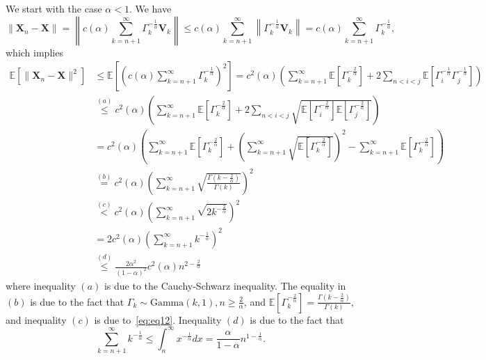 We start with the case $\alpha<1$. We have
\[
    \|\mathbf{X}_n-\mathbf{X}\|=\left\|c(\alpha) \sum_{k=n+1}^{\infty}\Gamma_{k}^{-\frac{1}{\alpha}}\mathbf{V}_k\right\|\leq c(\alpha) \sum_{k=n+1}^{\infty}\left\|\Gamma_{k}^{-\frac{1}{\alpha}}\mathbf{V}_k\right\| = c(\alpha)\sum_{k=n+1}^{\infty}\Gamma_k^{-\frac{1}{\alpha}},
\]
which implies
\begin{align}
\mathbb{E} \left[ \|\mathbf{X}_n-\mathbf{X}\|^2 \right] & \leq \mathbb{E} \left[ \left(c(\alpha)\sum_{k=n+1}^{\infty}\Gamma_k^{-\frac{1}{\alpha}}\right)^2 \right]
= c^{2}(\alpha)\left(\sum_{k=n+1}^{\infty} \mathbb{E}\left[\Gamma_k^{-\frac{2}{\alpha}}\right]+2\sum_{n<i<j}\mathbb{E}\left[\Gamma_{i}^{-\frac{1}{\alpha}}\Gamma_{j}^{-\frac{1}{\alpha}}\right]\right)\nonumber\\
&\overset{(a)}{\leq} c^{2}(\alpha)\left( \sum_{k=n+1}^{\infty} \mathbb{E}\left[ \Gamma_k^{-\frac{2}{\alpha}}\right]+2\sum_{n<i<j}\sqrt{\mathbb{E}\left[\Gamma_{i}^{-\frac{2}{\alpha}}\right]\mathbb{E}\left[\Gamma_{j}^{-\frac{2}{\alpha}}\right]}\right) \\
&=c^{2}(\alpha)\left(\sum_{k=n+1}^{\infty} \mathbb{E}\left[ \Gamma_k^{-\frac{2}{\alpha}}\right]+\left(\sum_{k=n+1}^{\infty}\sqrt{\mathbb{E}\left[\Gamma_k^{-\frac{2}{\alpha}}\right]}\right)^2-\sum_{k=n+1}^{\infty}\mathbb{E}\left[\Gamma_k^{-\frac{2}{\alpha}}\right]\right)\\
&\overset{(b)}{=}c^{2}(\alpha)\left(\sum_{k=n+1}^{\infty}\sqrt{\frac{\Gamma(k-\frac{2}{\alpha})}{\Gamma(k)}}\right)^2 \\
&\overset{(c)}{<}c^{2}(\alpha) \left(\sum_{k=n+1}^{\infty}\sqrt{2k^{-\frac{2}{\alpha}}}\right)^2 \\
&=2c^{2}(\alpha)\left(\sum_{k=n+1}^{\infty}k^{-\frac{1}{\alpha}}\right)^2\nonumber\\
&\overset{(d)}{\leq} \frac{2\alpha^2}{(1-\alpha)^2}c^{2}(\alpha)n^{2-\frac{2}{\alpha}}
\end{align}
where inequality $(a)$ is due to the Cauchy-Schwarz inequality. The equality in $(b)$ is due to the fact that $\Gamma_k\sim\text{Gamma}(k,1),n\geq \frac{2}{\alpha}$, and $\mathbb{E}\left[\Gamma_k^{-\frac{2}{\alpha}}\right]=\frac{\Gamma(k-\frac{2}{\alpha})}{\Gamma(k)}$, and inequality $(c)$ is due to~\eqref{eq:eq12}. Inequality $(d)$ is due to the fact that \begin{equation}
    \sum_{k=n+1}^{\infty}k^{-\frac{1}{\alpha}}\leq\int_{n}^{\infty}x^{-\frac{1}{\alpha}}dx=\frac{\alpha}{1-\alpha}n^{1-\frac{1}{\alpha}}.
    \end{equation}


